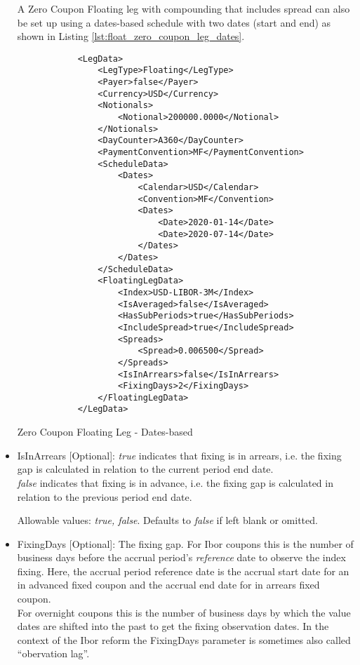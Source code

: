 \begin{itemize}
A Zero Coupon Floating leg with compounding that includes spread can also be set up using a dates-based schedule with two dates (start and end) as shown
in Listing \ref{lst:float_zero_coupon_leg_dates}. \begin{listing}[H]
\begin{verbatim}
            <LegData>
                <LegType>Floating</LegType>
                <Payer>false</Payer>
                <Currency>USD</Currency>
                <Notionals>
                    <Notional>200000.0000</Notional>
                </Notionals>
                <DayCounter>A360</DayCounter>
                <PaymentConvention>MF</PaymentConvention>
                <ScheduleData>
                    <Dates>
                        <Calendar>USD</Calendar>
                        <Convention>MF</Convention>
                        <Dates>
                            <Date>2020-01-14</Date>
                            <Date>2020-07-14</Date>
                        </Dates>
                    </Dates>
                </ScheduleData>
                <FloatingLegData>
                    <Index>USD-LIBOR-3M</Index>
                    <IsAveraged>false</IsAveraged>
                    <HasSubPeriods>true</HasSubPeriods>
                    <IncludeSpread>true</IncludeSpread>
                    <Spreads>
                        <Spread>0.006500</Spread>
                    </Spreads>
                    <IsInArrears>false</IsInArrears>
                    <FixingDays>2</FixingDays>
                </FloatingLegData>
            </LegData>
\end{verbatim}
\caption{Zero Coupon Floating Leg - Dates-based}
\label{lst:float_zero_coupon_leg_dates}
\end{listing}



\item IsInArrears [Optional]:  \emph{true} indicates that  fixing is in arrears,
  i.e. the fixing gap is calculated in relation to the current period
  end date.\\ \emph{false} indicates that  fixing is in advance,
  i.e. the fixing gap is calculated in relation to the previous period
  end date.  

Allowable values:  \emph{true, false}. Defaults to \emph{false} if left blank or omitted.

\item FixingDays [Optional]: The fixing gap. For Ibor coupons this is the number of business days before the accrual
  period's {\em reference} date to observe the index fixing. Here, the accrual period reference date is the accrual
  start date for an in advanced fixed coupon and the accrual end date for in arrears fixed coupon. \\
  For overnight coupons this is the number of business days by which the value dates are shifted into the past to get
  the fixing observation dates. In the context of the Ibor reform the FixingDays parameter is sometimes also called
  ``obervation lag''.


\end{itemize}

